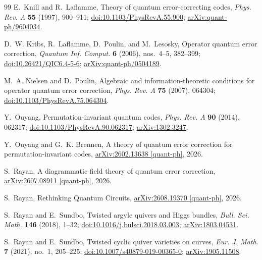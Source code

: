 \documentclass[11pt]{article}
\theoremstyle{definition}
\theoremstyle{remark}
\begin{document}
\begin{thebibliography}{99}
E.~Knill and R.~Laflamme,
\newblock Theory of quantum error-correcting codes,
\newblock \emph{Phys. Rev. A} \textbf{55} (1997), 900--911;
\href{https://doi.org/10.1103/PhysRevA.55.900}{doi:10.1103/PhysRevA.55.900};
\href{https://arxiv.org/abs/quant-ph/9604034}{arXiv:quant-ph/9604034}.

D.~W. Kribs, R.~Laflamme, D.~Poulin, and M.~Lesosky,
\newblock Operator quantum error correction,
\newblock \emph{Quantum Inf. Comput.} \textbf{6} (2006), nos.~4--5, 382--399;
\href{https://doi.org/10.26421/QIC6.4-5-6}{doi:10.26421/QIC6.4-5-6};
\href{https://arxiv.org/abs/quant-ph/0504189}{arXiv:quant-ph/0504189}.

M.~A. Nielsen and D.~Poulin,
\newblock Algebraic and information-theoretic conditions for operator quantum error correction,
\newblock \emph{Phys. Rev. A} \textbf{75} (2007), 064304;
\href{https://doi.org/10.1103/PhysRevA.75.064304}{doi:10.1103/PhysRevA.75.064304}.

Y.~Ouyang,
\newblock Permutation-invariant quantum codes,
\newblock \emph{Phys. Rev. A} \textbf{90} (2014), 062317;
\href{https://doi.org/10.1103/PhysRevA.90.062317}{doi:10.1103/PhysRevA.90.062317};
\href{https://arxiv.org/abs/1302.3247}{arXiv:1302.3247}.

Y.~Ouyang and G.~K. Brennen,
\newblock A theory of quantum error correction for permutation-invariant codes,
\newblock \href{https://arxiv.org/abs/2602.13638}{arXiv:2602.13638 [quant-ph]}, 2026.

S.~Rayan,
\newblock A diagrammatic field theory of quantum error correction,
\newblock \href{https://arxiv.org/abs/2607.08911}{arXiv:2607.08911 [quant-ph]}, 2026.

S.~Rayan,
\newblock Rethinking Quantum Circuits,
\newblock \href{https://arxiv.org/abs/2608.19370}{arXiv:2608.19370 [quant-ph]}, 2026.

S.~Rayan and E.~Sundbo,
\newblock Twisted argyle quivers and Higgs bundles,
\newblock \emph{Bull. Sci. Math.} \textbf{146} (2018), 1--32;
\href{https://doi.org/10.1016/j.bulsci.2018.03.003}{doi:10.1016/j.bulsci.2018.03.003};
\href{https://arxiv.org/abs/1803.04531}{arXiv:1803.04531}.

S.~Rayan and E.~Sundbo,
\newblock Twisted cyclic quiver varieties on curves,
\newblock \emph{Eur. J. Math.} \textbf{7} (2021), no.~1, 205--225;
\href{https://doi.org/10.1007/s40879-019-00365-0}{doi:10.1007/s40879-019-00365-0};
\href{https://arxiv.org/abs/1905.11508}{arXiv:1905.11508}.


\end{thebibliography}
\end{document}
